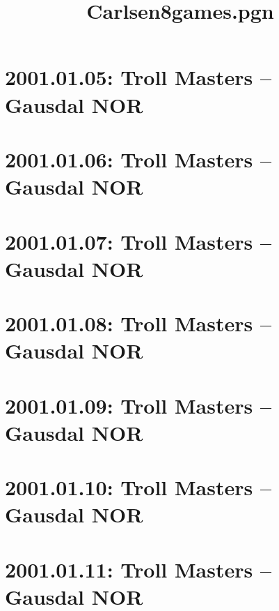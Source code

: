 \documentclass[11pt]{article}
\title{Carlsen8games.pgn}
\begin{document}
\maketitle


\tableofcontents
\pagebreak[4]

\section{2001.01.05: Troll Masters -- Gausdal NOR}

\pagebreak[4]

\section{2001.01.06: Troll Masters -- Gausdal NOR}

\pagebreak[4]

\section{2001.01.07: Troll Masters -- Gausdal NOR}

\pagebreak[4]

\section{2001.01.08: Troll Masters -- Gausdal NOR}

\pagebreak[4]


\pagebreak[4]

\section{2001.01.09: Troll Masters -- Gausdal NOR}

\pagebreak[4]

\section{2001.01.10: Troll Masters -- Gausdal NOR}

\pagebreak[4]

\section{2001.01.11: Troll Masters -- Gausdal NOR}

\pagebreak[4]
\end{document}
